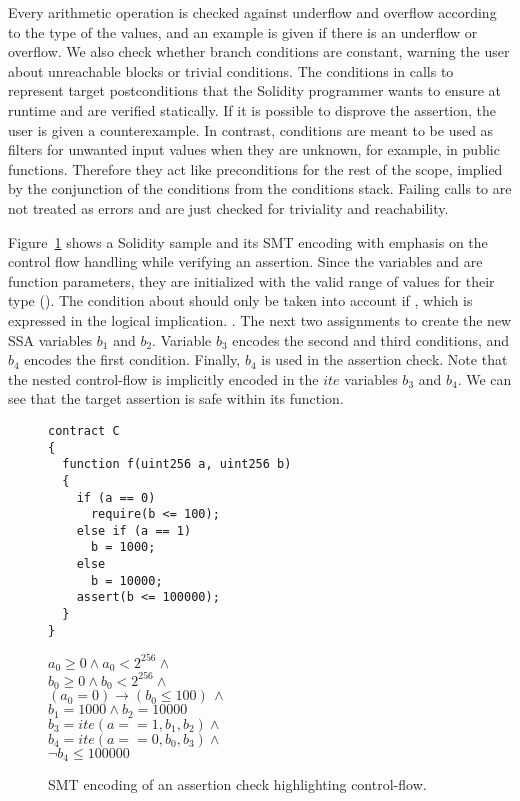 Every arithmetic operation is checked against underflow and overflow according
to the type of the values, and an example is given if there is an underflow or
overflow.
%
We also check whether branch conditions are constant, warning the user about
unreachable blocks or trivial conditions.
%
The conditions in calls to  represent target postconditions that the
Solidity programmer wants to ensure at runtime and are verified statically.
%
If it is possible to disprove the assertion, the user is given a
counterexample.
%
In contrast,  conditions are meant to be used as
filters for unwanted input values when they are unknown, for example, in public
functions.
%
Therefore they act like preconditions for the rest of the scope, implied by the
conjunction of the conditions from the conditions stack.
%
Failing calls to  are not treated as errors and
are just checked for triviality and reachability.
%

Figure~\ref{figure:solidity_encoding_1} shows a Solidity sample and its SMT
encoding with emphasis on the control flow handling while verifying an assertion.
%
Since the variables  and  are function parameters, they
are initialized with the valid range of values for their type ().
%
The  condition about  should only be taken into account
if , which is expressed in the logical implication. .
%
The next two assignments to  create the new SSA variables
$b_1$ and $b_2$.
%
Variable $b_3$ encodes the second and third conditions, and $b_4$
encodes the first condition.
%
Finally, $b_4$ is used in the assertion check.
%
Note that the nested control-flow is implicitly encoded in the $ite$
variables $b_3$ and $b_4$.
%
We can see that the target assertion is safe within its function.

\begin{figure}
\label{figure:solidity_encoding_1}
\noindent\begin{minipage}{.48\textwidth}
\begin{verbatim}
contract C
{
  function f(uint256 a, uint256 b)
  {
    if (a == 0)
      require(b <= 100);
    else if (a == 1)
      b = 1000;
    else
      b = 10000;
    assert(b <= 100000);
  }
}
\end{verbatim}
\end{minipage}\hfill
\begin{minipage}{.48\textwidth}
$a_0 \ge 0 \land a_0 < 2^{256}  \land \phantom{x}$\\
$b_0 \ge 0 \land b_0 < 2^{256}  \land \phantom{x}$\\
$(a_0 = 0) \rightarrow (b_0 \le 100) \, \land$\\
$b_1 = 1000 \land b_2 = 10000$\\
$b_3 = ite(a == 1, b_1, b_2) \land \phantom{x}$\\
$b_4 = ite(a == 0, b_0, b_3) \land \phantom{x}$\\
$\neg b_4 \le 100000$
\end{minipage}
\caption{SMT encoding of an assertion check highlighting control-flow.}
\end{figure}

